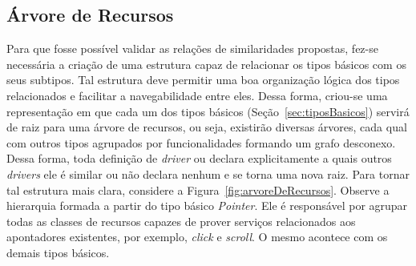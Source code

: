 \subsection{Árvore de Recursos}
\label{subsec:arvoreDeRecursos}

Para que fosse possível validar as relações de similaridades propostas, fez-se necessária a criação de uma estrutura capaz de relacionar os tipos básicos com os seus subtipos. Tal estrutura deve permitir uma boa organização lógica dos tipos relacionados e facilitar a navegabilidade entre eles. Dessa forma, criou-se uma representação em que cada um dos tipos básicos (Seção~\ref{sec:tiposBasicos}) servirá de raiz para uma árvore de recursos, ou seja, existirão diversas árvores, cada qual com outros tipos agrupados por funcionalidades formando um grafo desconexo. Dessa forma, toda definição de \emph{driver} ou declara explicitamente a quais outros \emph{drivers} ele é similar ou não declara nenhum e se torna uma nova raiz. Para tornar tal estrutura mais clara, considere a Figura~\ref{fig:arvoreDeRecursos}. Observe a hierarquia formada a partir do tipo básico \emph{Pointer}. Ele é responsável por agrupar todas as classes de recursos capazes de prover serviços relacionados aos apontadores existentes, por exemplo, \emph{click} e \emph{scroll}. O mesmo acontece com os demais tipos básicos.

